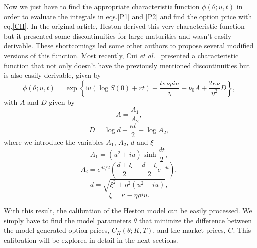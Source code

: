 Now we just have to find the appropriate characteristic function $\phi(\theta;u,t)$ in order to evaluate the integrals in eqs.\eqref{P1} and \eqref{P2} and find the option price with eq.\eqref{CH}. In the original article, Heston derived this very characteristic function~\cite{Heston} but it presented some discontinuities for large maturities and wasn't easily derivable. These shortcomings led some other authors to propose several modified versions of this function. Most recently, Cui \textit{et al.}~\citep{Cui} presented a characteristic function that not only doesn't have the previously mentioned discontinuities but is also easily derivable, given by
\begin{equation}
\phi(\theta;u,t)=\exp\left\{iu\left(\log S(0)+rt\right)-\frac{t\kappa\overline{\nu}\rho iu}{\eta}-\nu_0A+\frac{2\kappa\overline{\nu}}{\eta^2}D\right\},
\end{equation}
\noindent with $A$ and $D$ given by
\begin{equation}
A=\frac{A_1}{A_2},
\end{equation}
\begin{equation}
D=\log d+\frac{\kappa t}{2}-\log A_2,
\end{equation}
\noindent where we introduce the variables $A_1$, $A_2$, $d$  and $\xi$
\begin{equation}
A_1=(u^2+iu)\sinh\frac{dt}{2},
\end{equation}
\begin{equation}
A_2=e^{dt/2}\left(\frac{d+\xi}{2}+\frac{d-\xi}{2}e^{-dt}\right),
\end{equation}
\begin{equation}
d=\sqrt{\xi^2+\eta^2(u^2+iu)},
\end{equation}
\begin{equation}
\xi=\kappa-\eta\rho iu.
\end{equation}

With this result, the calibration of the Heston model can be easily processed. We simply have to find the model parameters $\theta$ that minimize the difference between the model generated option prices, $C_H(\theta;K,T)$, and the market prices, $\overline{C}$. This calibration will be explored in detail in the next sections.

\iffalse
Calibrating the parameters  $\rho$, $\kappa$, $\overline{\nu}$ and $\eta$ is absolutely critical. A model with badly calibrated parameters would output wrong predictions, rendering it completely useless.
This calibration requires a fair amount of past market data and is by far the most complex and computationally demanding section of this model. We will deal with it in the next section.
\fi





